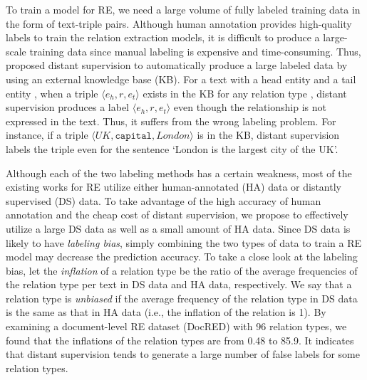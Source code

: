 \documentclass[11pt]{article}
\newcommand{\triple}[3]{\ensuremath{\langle #1,#2,#3\rangle}}
\newcommand{\head}{\xspace}
\newcommand{\tail}{\xspace}
\newcommand{\ehead}{e_{h}}
\newcommand{\etail}{e_{t}}
\newcommand{\relationt}[1]{\texttt{#1}}
\begin{document}

To train a model for RE, we need a large volume of fully labeled training data in the form of text-triple pairs.
Although human annotation provides high-quality labels to train the relation extraction models, it is difficult to produce a large-scale training data since manual labeling is expensive and time-consuming.
Thus,  proposed distant supervision to automatically produce a large labeled data by using an external knowledge base (KB).
For a text with a head entity \head and a tail entity \tail, when a triple \triple{\ehead}{r}{\etail} exists in the KB for any relation type , distant supervision produces a label \triple{\ehead}{r}{\etail} even though the relationship is not expressed in the text.
Thus, it suffers from the wrong labeling problem.
For instance, if a triple \triple{UK}{\relationt{capital}}{London} is in the KB, distant supervision labels the triple 
even for the sentence `London is the largest city of the UK'.


Although each of the two labeling methods has a certain weakness, most of the existing works for RE utilize either human-annotated (HA) data or distantly supervised (DS) data.
To take advantage of the high accuracy of human annotation and the cheap cost of distant supervision, we propose to effectively utilize a large DS data as well as a small amount of HA data.
Since DS data is likely to have \emph{labeling bias}, simply combining the two types of data to train a RE model may decrease the prediction accuracy.
To take a close look at the labeling bias, let the \emph{inflation} of a relation type be the ratio of the average frequencies of the relation type per text in DS data and HA data, respectively.
We say that a relation type is \emph{unbiased} if the average frequency of the relation type in DS data is the same as that in HA data (i.e., the inflation of the relation is 1).
By examining a document-level RE dataset (DocRED) \cite{yao2019docred} with 96 relation types, we found that the inflations of the relation types are from 0.48 to 85.9.
It indicates that distant supervision tends to generate a large number of false labels for some relation types.
\end{document}
